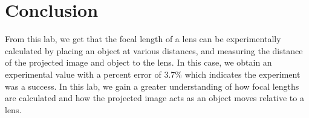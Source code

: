 \documentclass[12pt]{article}
\begin{document}
\section{Conclusion}
From this lab, we get that the focal length of a lens can be experimentally calculated by placing an object at various distances, and measuring the distance of the projected image and object to the lens. In this case, we obtain an experimental value with a percent error of 3.7\% which indicates the experiment was a success. In this lab, we gain a greater understanding of how focal lengths are calculated and how the projected image acts as an object moves relative to a lens.
\end{document}
